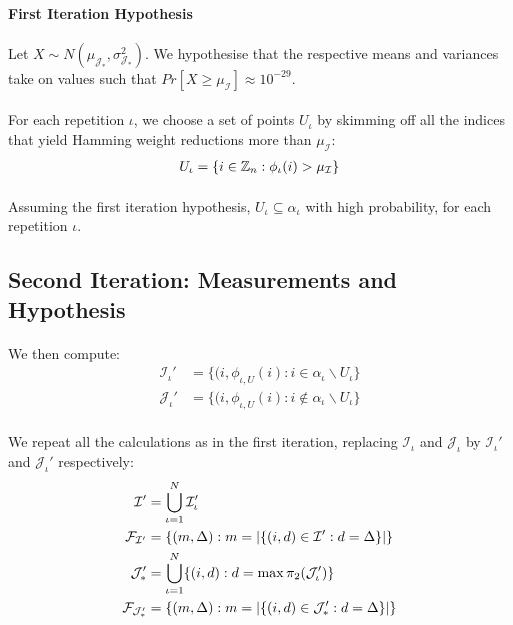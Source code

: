 \paragraph{\textbf{First Iteration Hypothesis}} Let $X \sim N(\mu_{\mathcal{J}_*}, \sigma_{\mathcal{J}_*}^2)$. We hypothesise that the respective means and variances take on values such that $Pr[X \geq \mu_\mathcal{I}] \approx 10^{-29}$.

\paragraph{}
For each repetition $\iota$, we choose a set of points $U_\iota$ by skimming off all the indices that yield Hamming weight reductions more than $\mu_\mathcal{I}$:
\begin{align*}
    U_\iota = \{ i \in \mathbb{Z}_n : \phi_\iota(i) > \mu_\mathcal{I} \}
\end{align*}

\paragraph{}
Assuming the first iteration hypothesis, $U_\iota \subseteq \alpha_\iota$ with high probability, for each repetition $\iota$.

\subsection{Second Iteration: Measurements and Hypothesis}
\paragraph{}
We then compute:
\begin{align*}
    \mathcal{I}_\iota' &= \{(i, \phi_{\iota, U}(i) : i \in \alpha_\iota \backslash U_\iota\}\\
    \mathcal{J}_\iota' &= \{(i, \phi_{\iota, U}(i) : i \not\in \alpha_\iota \backslash U_\iota\}
\end{align*}

\paragraph{}
We repeat all the calculations as in the first iteration, replacing $\mathcal{I}_\iota$ and $\mathcal{J}_\iota$ by $\mathcal{I}_\iota'$ and $\mathcal{J}_\iota'$ respectively:
\begin{align*}
    \mathcal{I}' &= \bigcup_{\iota = 1}^N \mathcal{I}_\iota'\\
    \mathcal{F}_{\mathcal{I}'} &= \{ (m, \Delta) : m = |\{ (i, d) \in \mathcal{I}' : d = \Delta \}| \}\\
    \mathcal{J}_*' &= \bigcup_{\iota = 1}^N \{ (i, d) : d = \max \pi_2(\mathcal{J}_\iota') \}\\
    \mathcal{F}_{\mathcal{J}_*'} &= \{ (m, \Delta) : m = |\{ (i, d) \in \mathcal{J}_*' : d = \Delta \}| \}
\end{align*}

